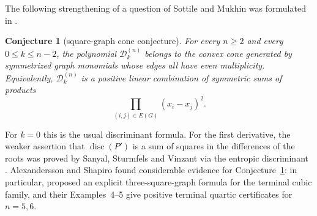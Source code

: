 \documentclass[11pt]{amsart}
\numberwithin{equation}{section}
\newtheorem{conjecture}[theorem]{Conjecture}
\newcommand{\D}{\mathcal D}
\newcommand{\disc}{\operatorname{disc}}
\begin{document}
The following strengthening of a question of Sottile and Mukhin was formulated
in \cite{AS}.

\begin{conjecture}[square-graph cone conjecture]\label{conj:squaregraph}
For every $n\ge2$ and every $0\le k\le n-2$, the polynomial $\D_k^{(n)}$
belongs to the convex cone generated by symmetrized graph monomials whose
edges all have even multiplicity.
Equivalently, $\D_k^{(n)}$ is a positive linear combination of symmetric sums
of products
\[
\prod_{(i,j)\in E(G)}(x_i-x_j)^2 .
\]
\end{conjecture}

For $k=0$ this is the usual discriminant formula.  For the first derivative,
the weaker assertion that $\disc(P')$ is a sum of squares in the differences of
the roots was proved by Sanyal, Sturmfels and Vinzant via the entropic
discriminant \cite[Corollary~14]{Sanyal}.  Alexandersson and Shapiro found
considerable evidence for Conjecture~\ref{conj:squaregraph}: in particular,
\cite[Example~3]{AS} proposed an explicit three-square-graph formula for the
terminal cubic family, and their Examples~4--5 give positive terminal quartic
certificates for $n=5,6$.
\end{document}
